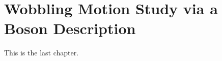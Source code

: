 \chapter{Wobbling Motion Study via a Boson Description}
\label{extra-chapter-new-boson}

This is the last chapter.